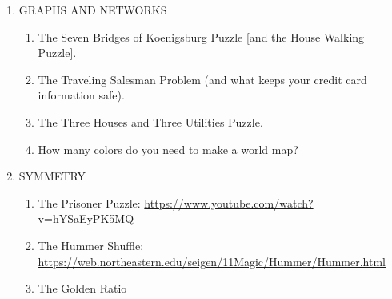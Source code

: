\documentclass[]{article}
\numberwithin{equation}{section}
\theoremstyle{definition}
\theoremstyle{remark}
\begin{document}
\begin{enumerate}
	\item GRAPHS AND NETWORKS
	\begin{enumerate}
		\item The Seven Bridges of Koenigsburg Puzzle [and the House Walking Puzzle].
		\item The Traveling Salesman Problem (and what keeps your credit card information safe).
		\item The Three Houses and Three Utilities Puzzle.
		\item How many colors do you need to make a world map?
	\end{enumerate}
	
	\item SYMMETRY
	\begin{enumerate}
		\item The Prisoner Puzzle: \url{https://www.youtube.com/watch?v=hYSaEyPK5MQ}
		\item The Hummer Shuffle: \url{https://web.northeastern.edu/seigen/11Magic/Hummer/Hummer.html}
		\item The Golden Ratio
	\end{enumerate}
\end{enumerate}
\end{document}
